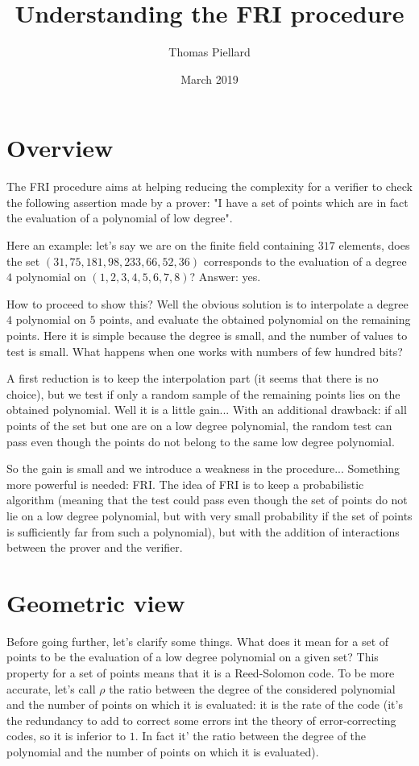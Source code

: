 \documentclass[12pt]{extarticle}
\title{Understanding the FRI procedure}
\author{Thomas Piellard}
\date{March 2019}
\newcommand{\<}{\langle}
\renewcommand{\>}{\rangle}
\theoremstyle{definition}
\begin{document}
\maketitle

\section{Overview}

The FRI procedure aims at helping reducing the complexity for a verifier to check the following assertion made by a prover: "I have a set of points which are in fact the evaluation of a polynomial of low degree".

Here an example: let's say we are on the finite field containing $317$ elements, does the set $(31,75,181,98,233,66,52,36)$ corresponds to the evaluation of a degree $4$ polynomial on $(1,2,3,4,5,6,7,8)$? Answer: yes.

How to proceed to show this? Well the obvious solution is to interpolate a degree $4$ polynomial on $5$ points, and evaluate the obtained polynomial on the remaining points. Here it is simple because the degree is small, and the number of values to test is small. What happens when one works with numbers of few hundred bits?

A first reduction is to keep the interpolation part (it seems that there is no choice), but we test if only a random sample of the remaining points lies on the obtained polynomial. Well it is a little gain... With an additional drawback: if all points of the set but one are on a low degree polynomial, the random test can pass even though the points do not belong to the same low degree polynomial.

So the gain is small and we introduce a weakness in the procedure... Something more powerful is needed: FRI. The idea of FRI is to keep a probabilistic algorithm (meaning that the test could pass even though the set of points do not lie on a low degree polynomial, but with very small probability if the set of points is sufficiently far from such a polynomial), but with the addition of interactions between the prover and the verifier.

\section{Geometric view}

Before going further, let's clarify some things. What does it mean for a set of points to be the evaluation of a low degree polynomial on a given set? This property for a set of points means that it is a Reed-Solomon code. To be more accurate, let's call $\rho$ the ratio between the degree of the considered polynomial and the number of points on which it is evaluated: it is the rate of the code (it's the redundancy to add to correct some errors int the theory of error-correcting codes, so it is inferior to $1$. In fact it' the ratio between the degree of the polynomial and the number of points on which it is evaluated).
\end{document}
